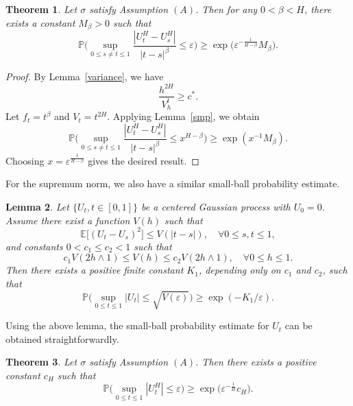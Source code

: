 \documentclass[preprint,12pt]{elsarticle}
\newtheorem{theorem}{Theorem}[section]
\newtheorem{lemma}[theorem]{Lemma}
\theoremstyle{definition}  %
\theoremstyle{plain}  %
\begin{document}
	
	
	
	
	
	
	
\begin{theorem}
Let $ \sigma $ satisfy Assumption \((A)\).
Then for any $0 < \beta < H$, there exists a constant $M_\beta > 0$ such that
\begin{equation}
\mathbb{P}\Bigg(
\sup_{0 \leq s \neq t \leq 1} \frac{|U^H_t - U^H_s|}{|t-s|^\beta} \leq \varepsilon
\Bigg) 
\geq \exp\Big(\varepsilon^{-\frac{1}{H-\beta}} M_\beta \Big). \label{smbp}
\end{equation}
\end{theorem}

\begin{proof}
By Lemma~\ref{variance}, we have
\[
\frac{h^{2H}}{V_h^t} \geq c^*.
\]
Let $f_t = t^\beta$ and $V_t = t^{2H}$. Applying Lemma~\ref{smp}, we obtain
\[
\mathbb{P}\Bigg(
\sup_{0 \leq s \neq t \leq 1} \frac{|U^H_t - U^H_s|}{|t-s|^\beta} \leq x^{H-\beta}
\Bigg) 
\geq \exp(x^{-1} M_\beta).
\]
Choosing $x = \varepsilon^{\frac{1}{H-\beta}}$ gives the desired result.
\end{proof}





 For the supremum norm, we also have a similar small-ball probability estimate.

\begin{lemma}
Let $\{U_t, t \in [0,1]\}$ be a centered Gaussian process with $U_0 = 0$. Assume there exist a function $V(h)$ such that
\begin{equation}
\mathbb{E}\big[(U_t - U_s)^2\big] \leq V(|t-s|), \quad \forall 0 \leq s,t \leq 1, \label{variance_bound}
\end{equation}
and constants $0 < c_1 \leq c_2 < 1$ such that
\[
c_1 V(2h \wedge 1) \leq V(h) \leq c_2 V(2h \wedge 1), \quad \forall 0 \leq h \leq 1.
\]
Then there exists a positive finite constant $K_1$, depending only on $c_1$ and $c_2$, such that
\begin{equation}
\mathbb{P}\Big( \sup_{0 \leq t \leq 1} |U_t| \leq \sqrt{V(\varepsilon)} \Big) \geq \exp(-K_1 / \varepsilon). \label{sup_gauss}
\end{equation}
\end{lemma}

Using the above lemma, the small-ball probability estimate for $U_t$ can be obtained straightforwardly.

\begin{theorem}
Let $\sigma$ satisfy Assumption \((A)\).
Then there exists a positive constant $c_H$ such that
\begin{equation}
\mathbb{P}\Bigg(
\sup_{0 \leq t \leq 1} |U^H_t| \leq \varepsilon
\Bigg) \geq \exp\Big( \varepsilon^{-\frac{1}{H}} c_H \Big).
\end{equation}
\end{theorem}
\end{document}

